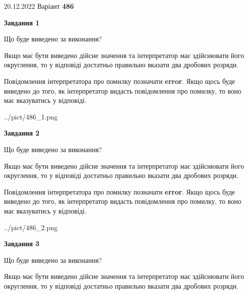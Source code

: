 \documentclass[12pt, ukrainian]{article}
\begin{document}
{20.12.2022 Варіант \No \textbf { 486 }\par}
{
\begin {Large}

{\begin {center}\textbf{Завдання 1}\end {center}}\par
Що буде виведено за виконання? \par

Якщо має бути виведено дійсне значення та інтерпретатор має здійснювати його округлення, 
то у відповіді достатньо правильно вказати два дробових розряди.

Повідомлення інтерпретатора про помилку позначати \textbf{error}.
Якщо щось буде виведено до того, як інтерпретатор видасть повідомлення про помилку, 
то воно має вказуватись у відповіді. \par

\begin{center}
	{../pict/486_1.png}
\end{center}
\newpage

{\begin {center}\textbf{Завдання 2}\end {center}}\par
Що буде виведено за виконання? \par

Якщо має бути виведено дійсне значення та інтерпретатор має здійснювати його округлення, 
то у відповіді достатньо правильно вказати два дробових розряди.

Повідомлення інтерпретатора про помилку позначати \textbf{error}.
Якщо щось буде виведено до того, як інтерпретатор видасть повідомлення про помилку, 
то воно має вказуватись у відповіді. \par

\begin{center}
	{../pict/486_2.png}
\end{center}
\newpage

{\begin {center}\textbf{Завдання 3}\end {center}}\par
Що буде виведено за виконання? \par

Якщо має бути виведено дійсне значення та інтерпретатор має здійснювати його округлення, 
то у відповіді достатньо правильно вказати два дробових розряди.


\end{Large}}
\end{document}
